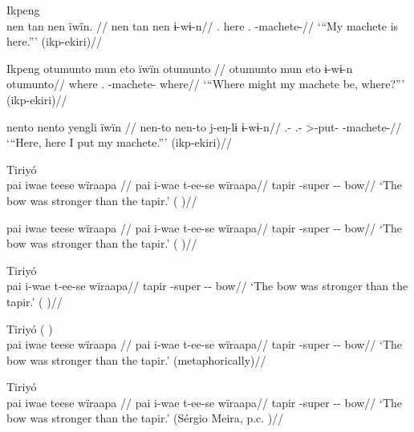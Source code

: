 \documentclass{article}
\begin{document}
\ex  Ikpeng  \\\label{ekiri-13}
\begingl \glpreamble nen tan nen ïwïn. //
\gla nen tan nen ɨ-wɨ-n//
\glb {}. here . -machete-//
\glft ‘“My machete is here.”’ (ikp-ekiri)//
\endgl
\xe

\pex Ikpeng\label{machete}    
\a \label{ekiri-9}
\begingl \glpreamble otumunto mun eto ïwïn otumunto //
\gla otumunto mun eto ɨ-wɨ-n otumunto//
\glb where .  -machete- where//
\glft ‘“Where might my machete be, where?”’ (ikp-ekiri)//
\endgl

    
\a \label{ekiri-10}
\begingl \glpreamble nento nento yengli ïwïn //
\gla nen-to nen-to j-eŋ-lɨ ɨ-wɨ-n//
\glb {}.- .- >-put- -machete-//
\glft ‘“Here, here I put my machete.”’ (ikp-ekiri)//
\endgl

\xe

\ex  Tiriyó  \\\label{tri-1}
\begingl \glpreamble pai iwae teese wïraapa //
\gla pai i-wae t-ee-se wïraapa//
\glb tapir -super -- bow//
\glft ‘The bow was stronger than the tapir.’ (\cite[420]{triomeira1999}
)//
\endgl
\xe

\ex \label{tri-1}
\begingl \glpreamble pai iwae teese wïraapa //
\gla pai i-wae t-ee-se wïraapa//
\glb tapir -super -- bow//
\glft ‘The bow was stronger than the tapir.’ (\cite[420]{triomeira1999}
)//
\endgl
\xe

\ex  Tiriyó  \\\label{tri-1}
\begingl 
\gla pai i-wae t-ee-se wïraapa//
\glb tapir -super -- bow//
\glft ‘The bow was stronger than the tapir.’ (\cite[420]{triomeira1999}
)//
\endgl
\xe

\ex  Tiriyó (\cite[420]{triomeira1999}
) \\\label{tri-1}
\begingl \glpreamble pai iwae teese wïraapa //
\gla pai i-wae t-ee-se wïraapa//
\glb tapir -super -- bow//
\glft ‘The bow was stronger than the tapir.’ (metaphorically)//
\endgl
\xe

\ex  Tiriyó  \\\label{tri-1}
\begingl \glpreamble pai iwae teese wïraapa //
\gla pai i-wae t-ee-se wïraapa//
\glb tapir -super -- bow//
\glft ‘The bow was stronger than the tapir.’ (Sérgio Meira, p.c.
)//
\endgl
\xe
\end{document}
